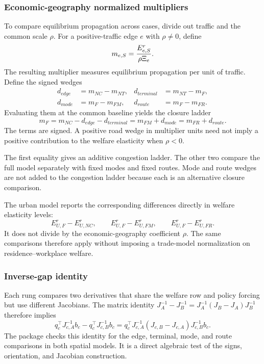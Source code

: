 \subsubsection{Economic-geography normalized multipliers}

To compare equilibrium propagation across cases, divide out traffic and
the common scale \(\rho\). For a positive-traffic edge \(e\) with
\(\rho\neq0\), define
\begin{equation}
 m_{e,S}=\frac{E^{r}_{e,S}}{\rho\Xi_e}.
\label{eq:guide-normalized-multiplier}
\end{equation}
The resulting multiplier measures equilibrium propagation per unit of
traffic. Define the signed wedges
\[
\begin{aligned}
 d_{edge}&=m_{NC}-m_{NT},&
 d_{terminal}&=m_{NT}-m_F,\\
 d_{mode}&=m_F-m_{FM},&
 d_{route}&=m_F-m_{FR}.
\end{aligned}
\]
Evaluating them at the common baseline yields the closure ladder
\begin{equation}
 m_F=m_{NC}-d_{edge}-d_{terminal}
    =m_{FM}+d_{mode}
    =m_{FR}+d_{route}.
\label{eq:guide-closure-ladder}
\end{equation}
The terms are signed. A positive road wedge in multiplier units need not imply
a positive contribution to the welfare elasticity when \(\rho<0\).

The first equality gives an additive congestion ladder. The other two compare
the full model separately with fixed modes and fixed routes. Mode and route
wedges are not added to the congestion ladder because each is an alternative
closure comparison.

The urban model reports the corresponding differences directly in welfare
elasticity levels:
\[
 E_{U,F}^r-E_{U,NC}^r,\qquad
 E_{U,F}^r-E_{U,FM}^r,\qquad
 E_{U,F}^r-E_{U,FR}^r.
\]
It does not divide by the economic-geography coefficient \(\rho\). The same
comparisons therefore apply without imposing a trade-model
normalization on residence--workplace welfare.

\subsubsection{Inverse-gap identity}

Each rung compares two derivatives that share the welfare row and policy
forcing but use different Jacobians. The matrix identity
\(J_A^{-1}-J_B^{-1}=J_A^{-1}(J_B-J_A)J_B^{-1}\) therefore implies
\[
 q_c^\top J_{c,A}^{-1}b_c-q_c^\top J_{c,B}^{-1}b_c
 =q_c^\top J_{c,A}^{-1}
 (J_{c,B}-J_{c,A})J_{c,B}^{-1}b_c.
\]
The package checks this identity for the edge, terminal, mode, and route
comparisons in both spatial models. It is a direct algebraic test of the
signs, orientation, and Jacobian construction.

